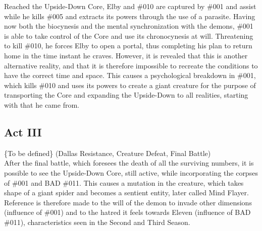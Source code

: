 Reached the Upside-Down Core, Elby and \#010 are captured by \#001 and assist while he kills \#005 and extracts its powers through the use of a parasite. 
Having now both the biocynesis and the mental synchronization with the demons, \#001 is able to take control of the Core and use its chronocynesis at will.
Threatening to kill \#010, he forces Elby to open a portal, thus completing his plan to return home in the time instant he craves. However, it is revealed
that this is another alternative reality, and that it is therefore impossible to recreate the conditions to have the correct time and space. This causes a 
psychological breakdown in \#001, which kills \#010 and uses its powers to create a giant creature for the purpose of transporting the Core and expanding 
the Upside-Down to all realities, starting with that he came from.

\subsection{Act III}
\{To be defined\} (Dallas Resistance, Creature Defeat, Final Battle)\\

After the final battle, which foresees the death of all the surviving numbers, it is possible to see the Upside-Down Core, still active, while incorporating
the corpses of \#001 and BAD \#011. This causes a mutation in the creature, which takes shape of a giant spider and becomes a sentient entity, later called 
Mind Flayer. Reference is therefore made to the will of the demon to invade other dimensions (influence of \#001) and to the hatred it feels towards Eleven 
(influence of BAD \#011), characteristics seen in the Second and Third Season.
